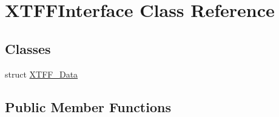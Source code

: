 \hypertarget{classXTFFInterface}{}\section{X\+T\+F\+F\+Interface Class Reference}
\label{classXTFFInterface}
\subsection*{Classes}
\begin{DoxyCompactItemize}
\item 
struct \hyperlink{structXTFFInterface_1_1XTFF__Data}{X\+T\+F\+F\+\_\+\+Data}
\end{DoxyCompactItemize}
\subsection*{Public Member Functions}
